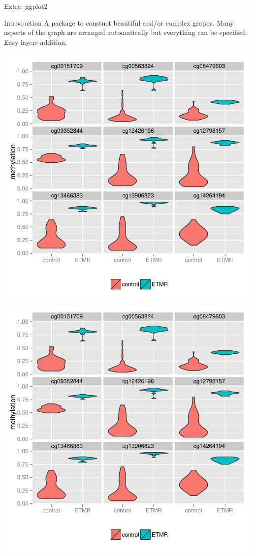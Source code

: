 \documentclass[10pt]{beamer}
\begin{document}

\begin{frame}{Extra: {\sf ggplot2}}
  \begin{block}{Introduction}
    A package to constuct beautiful and/or complex graphs. Many aspects of the graph are arranged automatically but everything can be specified. Easy layers addition.
  \end{block}
  
  \includegraphics[height=.6\textheight]{imgs/example-ggplot2.pdf}
  \includegraphics[height=.6\textheight,page=2]{imgs/example-ggplot2.pdf}

\end{frame}
\end{document}
